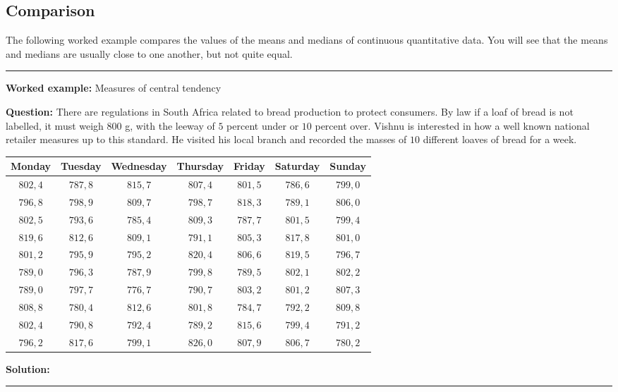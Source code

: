 \documentclass[a4paper,11pt]{report}
\newenvironment{wex}[3]%
{\rule{\linewidth}{0.5mm}
\textbf{Worked example:} #1

\textbf{Question:} #2

\textbf{Solution:} #3}%
{\rule{\linewidth}{0.5mm}}
\begin{document}
\subsection{Comparison}
The following worked example compares the values of the means and
medians of continuous quantitative data. You will see that the means
and medians are usually close to one another, but not quite equal.

\begin{wex}{Measures of central tendency}{
    There are regulations in South Africa related to bread production
    to protect consumers. By law if a loaf of bread is not labelled,
    it must weigh $800$ g, with the leeway of $5$ percent under or $10$
    percent over.  Vishnu is interested in how a well known national
    retailer measures up to this standard. He visited his local branch
    and recorded the masses of $10$ different loaves of bread for a
    week.

    \begin{center}
      \begin{tabular}{ccccccc}
        \toprule
        Monday & Tuesday & Wednesday & Thursday & Friday & Saturday & Sunday \\
        \midrule
        $802,4$ & $787,8$ & $815,7$ & $807,4$ & $801,5$ & $786,6$ & $799,0$ \\
        $796,8$ & $798,9$ & $809,7$ & $798,7$ & $818,3$ & $789,1$ & $806,0$ \\
        $802,5$ & $793,6$ & $785,4$ & $809,3$ & $787,7$ & $801,5$ & $799,4$ \\
        $819,6$ & $812,6$ & $809,1$ & $791,1$ & $805,3$ & $817,8$ & $801,0$ \\
        $801,2$ & $795,9$ & $795,2$ & $820,4$ & $806,6$ & $819,5$ & $796,7$ \\
        $789,0$ & $796,3$ & $787,9$ & $799,8$ & $789,5$ & $802,1$ & $802,2$ \\
        $789,0$ & $797,7$ & $776,7$ & $790,7$ & $803,2$ & $801,2$ & $807,3$ \\
        $808,8$ & $780,4$ & $812,6$ & $801,8$ & $784,7$ & $792,2$ & $809,8$ \\
        $802,4$ & $790,8$ & $792,4$ & $789,2$ & $815,6$ & $799,4$ & $791,2$ \\
        $796,2$ & $817,6$ & $799,1$ & $826,0$ & $807,9$ & $806,7$ & $780,2$ \\
        \bottomrule
      \end{tabular}
    \end{center}

}
\end{wex}
\end{document}
